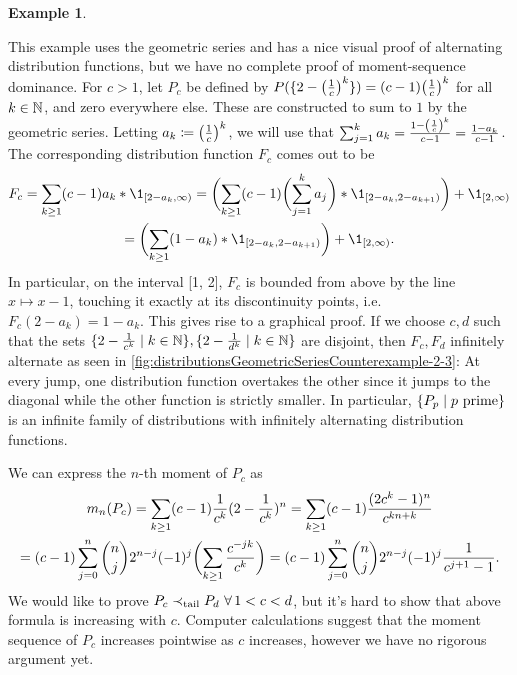 \documentclass[a4paper]{scrreprt}
\theoremstyle{definition}
\newtheorem{ex}[thm]{Example} %
\begin{document}
\begin{ex}
\begin{enumerate}
            \label{item:geometricSeriesSufficientTailOrderConditionCounterexample}
            This example uses the geometric series and has a nice visual proof of alternating distribution functions, but we have no complete proof of moment-sequence dominance.
            For $c > 1$, let $P_c$ be defined by $P(\{2-\bigl(\frac{1}{c}\bigr)^k\}) = (c-1)\bigl(\frac{1}{c}\bigr)^k$ for all $k \in \mathbb{N}$, and zero everywhere else.
            These are constructed to sum to $1$ by the geometric series.
            Letting $a_k \coloneqq \bigl(\frac{1}{c}\bigr)^k$, we will use that $\sum_{j = 1}^k  a_k = \frac{1 - \left(\frac{1}{c}\right)^k}{c - 1} = \frac{1 - a_k}{c - 1}$.
            The corresponding distribution function $F_c$ comes out to be 
            \begin{multline*}
                F_c 
                = \sum_{k \geq 1} (c-1) a_k * \1_{[2-a_k, \infty)}
                = \biggpars{\sum_{k \geq 1} (c-1) \biggpars{\sum_{j = 1}^k  a_j} * \1_{[2-a_k, 2-a_{k+1})}} + \1_{[2, \infty)} \\
                = \biggpars{\sum_{k \geq 1} (1-a_k) * \1_{[2-a_k, 2-a_{k+1})}} + \1_{[2, \infty)}.
            \end{multline*}
            In particular, on the interval [1, 2], $F_c$ is bounded from above by the line $x \mapsto x-1$, touching it exactly at its discontinuity points, i.e. $F_c(2-a_k) = 1-a_k$. This gives rise to a graphical proof.
            If we choose $c, d$ such that the sets $\{2 - \frac{1}{c^k} \mid k \in \mathbb{N}\}, \{2 - \frac{1}{d^k} \mid k \in \mathbb{N}\}$ are disjoint,
            then $F_c, F_d$ infinitely alternate as seen in \autoref{fig:distributionsGeometricSeriesCounterexample-2-3}:
            At every jump, one distribution function overtakes the other since it jumps to the diagonal while the other function is strictly smaller.
            In particular, $\{P_p \mid p \text{ prime}\}$ is an infinite family of distributions with infinitely alternating distribution functions.
            
            We can express the $n$-th moment of $P_c$ as
            \begin{multline*}
                m_n(P_c) 
                = \sum_{k \geq 1} (c-1) \frac{1}{c^k} (2-\frac{1}{c^k})^n
                = \sum_{k \geq 1} (c-1) \frac{(2c^k-1)^n}{c^{kn+k}} \\
                = (c-1)\sum_{j=0}^n \binom{n}{j}2^{n-j}(-1)^j \biggl(\sum_{k \geq 1}\frac{c^{-jk}}{c^k}\biggr)
                = (c-1)\sum_{j=0}^n \binom{n}{j}2^{n-j}(-1)^j \frac{1}{c^{j+1}-1}.
            \end{multline*}
            We would like to prove $P_c \prec_{\text{tail}} P_d ~ \forall\, 1 < c < d$, but it's hard to show that above formula is increasing with $c$.
            Computer calculations suggest that the moment sequence of $P_c$ increases pointwise as $c$ increases, however we have no rigorous argument yet.
          

\end{enumerate}
\end{ex}
\end{document}
